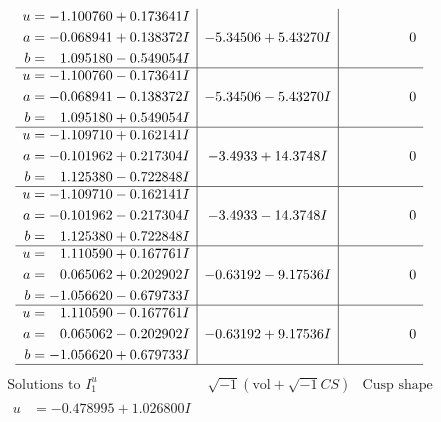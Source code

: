 \documentclass[1p]{elsarticle_modified}
\theoremstyle{definition}
\newcommand{\I}{\sqrt{-1}}
\begin{document}
$$\begin{array}{c|c|c}
\begin{aligned}
u &= -1.100760 + 0.173641 I \\
a &= -0.068941 + 0.138372 I \\
b &= \phantom{-}1.095180 - 0.549054 I\end{aligned}
 & -5.34506 + 5.43270 I & \phantom{-0.000000 } 0 \\ \hline\begin{aligned}
u &= -1.100760 - 0.173641 I \\
a &= -0.068941 - 0.138372 I \\
b &= \phantom{-}1.095180 + 0.549054 I\end{aligned}
 & -5.34506 - 5.43270 I & \phantom{-0.000000 } 0 \\ \hline\begin{aligned}
u &= -1.109710 + 0.162141 I \\
a &= -0.101962 + 0.217304 I \\
b &= \phantom{-}1.125380 - 0.722848 I\end{aligned}
 & -3.4933 + 14.3748 I & \phantom{-0.000000 } 0 \\ \hline\begin{aligned}
u &= -1.109710 - 0.162141 I \\
a &= -0.101962 - 0.217304 I \\
b &= \phantom{-}1.125380 + 0.722848 I\end{aligned}
 & -3.4933 - 14.3748 I & \phantom{-0.000000 } 0 \\ \hline\begin{aligned}
u &= \phantom{-}1.110590 + 0.167761 I \\
a &= \phantom{-}0.065062 + 0.202902 I \\
b &= -1.056620 - 0.679733 I\end{aligned}
 & -0.63192 - 9.17536 I & \phantom{-0.000000 } 0 \\ \hline\begin{aligned}
u &= \phantom{-}1.110590 - 0.167761 I \\
a &= \phantom{-}0.065062 - 0.202902 I \\
b &= -1.056620 + 0.679733 I\end{aligned}
 & -0.63192 + 9.17536 I & \phantom{-0.000000 } 0\\
 \hline 
 \end{array}$$\newpage$$\begin{array}{c|c|c}  
\text{Solutions to }I^u_{1}& \I (\text{vol} + \sqrt{-1}CS) & \text{Cusp shape}\\
 \hline 
\begin{aligned}
u &= -0.478995 + 1.026800 I \\

\end{aligned}
\end{array}$$
\end{document}
